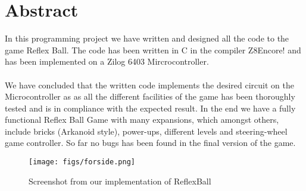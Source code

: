 \chapter{Abstract}

In this programming project we have written and designed all the code to the game Reflex Ball. The code has been written in C in the compiler Z8Encore! and has been implemented on a Zilog 6403 Mircrocontroller. \\ \\
We have concluded that the written code implements the desired circuit on the Microcontroller as as all the different facilities of the game has been thoroughly tested and is in compliance with the expected result. In the end we have a fully functional Reflex Ball Game with many expansions, which amongst others, include bricks (Arkanoid style), power-ups, different levels and steering-wheel game controller. So far no bugs has been found in the final version of the game.

\begin{figure}[h!]
\centering
\texttt{[image: figs/forside.png]}
\caption{Screenshot from our implementation of ReflexBall}
\label{fig:awesome}
\end{figure}